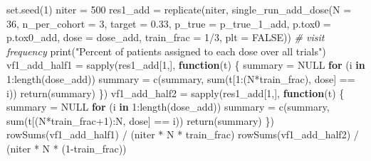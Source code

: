 \documentclass[
]{article}
\newenvironment{Shaded}{\begin{snugshade}}{\end{snugshade}}
\newcommand{\AttributeTok}[1]{\textcolor[rgb]{0.77,0.63,0.00}{#1}}
\newcommand{\CommentTok}[1]{\textcolor[rgb]{0.56,0.35,0.01}{\textit{#1}}}
\newcommand{\ConstantTok}[1]{\textcolor[rgb]{0.00,0.00,0.00}{#1}}
\newcommand{\ControlFlowTok}[1]{\textcolor[rgb]{0.13,0.29,0.53}{\textbf{#1}}}
\newcommand{\DecValTok}[1]{\textcolor[rgb]{0.00,0.00,0.81}{#1}}
\newcommand{\FloatTok}[1]{\textcolor[rgb]{0.00,0.00,0.81}{#1}}
\newcommand{\FunctionTok}[1]{\textcolor[rgb]{0.00,0.00,0.00}{#1}}
\newcommand{\NormalTok}[1]{#1}
\newcommand{\OtherTok}[1]{\textcolor[rgb]{0.56,0.35,0.01}{#1}}
\newcommand{\SpecialCharTok}[1]{\textcolor[rgb]{0.00,0.00,0.00}{#1}}
\newcommand{\StringTok}[1]{\textcolor[rgb]{0.31,0.60,0.02}{#1}}
\begin{document}
\begin{Shaded}
\begin{Highlighting}[]
\FunctionTok{set.seed}\NormalTok{(}\DecValTok{1}\NormalTok{)}
\NormalTok{niter }\OtherTok{=} \DecValTok{500}
\NormalTok{res1\_add }\OtherTok{=} \FunctionTok{replicate}\NormalTok{(niter, }\FunctionTok{single\_run\_add\_dose}\NormalTok{(}\AttributeTok{N =} \DecValTok{36}\NormalTok{, }\AttributeTok{n\_per\_cohort =} \DecValTok{3}\NormalTok{, }\AttributeTok{target =} \FloatTok{0.33}\NormalTok{, }\AttributeTok{p\_true =}\NormalTok{ p\_true\_1\_add, }\AttributeTok{p.tox0 =}\NormalTok{ p.tox0\_add, }\AttributeTok{dose =}\NormalTok{ dose\_add, }\AttributeTok{train\_frac =} \DecValTok{1}\SpecialCharTok{/}\DecValTok{3}\NormalTok{, }\AttributeTok{plt =} \ConstantTok{FALSE}\NormalTok{))}
\CommentTok{\# visit frequency}
\FunctionTok{print}\NormalTok{(}\StringTok{"Percent of patients assigned to each dose over all trials"}\NormalTok{)}
\NormalTok{vf1\_add\_half1 }\OtherTok{=} \FunctionTok{sapply}\NormalTok{(res1\_add[}\DecValTok{1}\NormalTok{,], }\ControlFlowTok{function}\NormalTok{(t) \{}
\NormalTok{summary }\OtherTok{=} \ConstantTok{NULL}
\ControlFlowTok{for}\NormalTok{ (i }\ControlFlowTok{in} \DecValTok{1}\SpecialCharTok{:}\FunctionTok{length}\NormalTok{(dose\_add)) summary }\OtherTok{=} \FunctionTok{c}\NormalTok{(summary, }\FunctionTok{sum}\NormalTok{(t[}\DecValTok{1}\SpecialCharTok{:}\NormalTok{(N}\SpecialCharTok{*}\NormalTok{train\_frac), }\StringTok{\textquotesingle{}dose\textquotesingle{}}\NormalTok{] }\SpecialCharTok{==}\NormalTok{ i))}
\FunctionTok{return}\NormalTok{(summary)}
\NormalTok{\})}
\NormalTok{vf1\_add\_half2 }\OtherTok{=} \FunctionTok{sapply}\NormalTok{(res1\_add[}\DecValTok{1}\NormalTok{,], }\ControlFlowTok{function}\NormalTok{(t) \{}
\NormalTok{summary }\OtherTok{=} \ConstantTok{NULL}
\ControlFlowTok{for}\NormalTok{ (i }\ControlFlowTok{in} \DecValTok{1}\SpecialCharTok{:}\FunctionTok{length}\NormalTok{(dose\_add)) summary }\OtherTok{=} \FunctionTok{c}\NormalTok{(summary, }\FunctionTok{sum}\NormalTok{(t[(N}\SpecialCharTok{*}\NormalTok{train\_frac}\SpecialCharTok{+}\DecValTok{1}\NormalTok{)}\SpecialCharTok{:}\NormalTok{N, }\StringTok{\textquotesingle{}dose\textquotesingle{}}\NormalTok{] }\SpecialCharTok{==}\NormalTok{ i))}
\FunctionTok{return}\NormalTok{(summary)}
\NormalTok{\})}
\FunctionTok{rowSums}\NormalTok{(vf1\_add\_half1) }\SpecialCharTok{/}\NormalTok{ (niter }\SpecialCharTok{*}\NormalTok{ N }\SpecialCharTok{*}\NormalTok{ train\_frac)}
\FunctionTok{rowSums}\NormalTok{(vf1\_add\_half2) }\SpecialCharTok{/}\NormalTok{ (niter }\SpecialCharTok{*}\NormalTok{ N }\SpecialCharTok{*}\NormalTok{ (}\DecValTok{1}\SpecialCharTok{{-}}\NormalTok{train\_frac))}

\end{Highlighting}
\end{Shaded}
\end{document}
